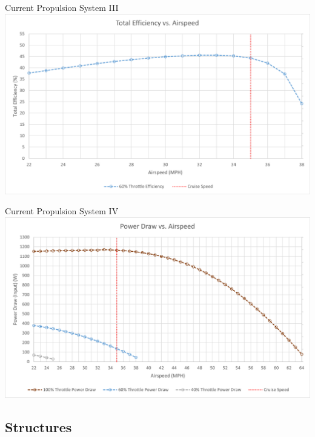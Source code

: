 \documentclass{beamer}
\newcommand{\setpresentername}[1]{\renewcommand{\presentername}{#1}}
\newcommand{\setpresentertitle}[1]{\renewcommand{\presentertitle}{#1}}
\newcommand{\presentername}{}
\newcommand{\presentertitle}{}
\begin{document}
    \begin{frame}{Current Propulsion System III}
        \centering
        \includegraphics[width=\linewidth]{figures/eff_vs_airspeed.png}
    \end{frame}

    \begin{frame}{Current Propulsion System IV}
        \centering
        \includegraphics[width=1\linewidth]{figures/powerDraw_vs_airspeed.png}
    \end{frame}

    \subsection{Structures}

    \setpresentername{Ethan Witt}
    \setpresentertitle{Lead Structural Engineer}
\end{document}
